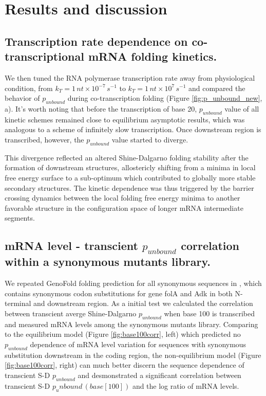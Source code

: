\documentclass[11pt, a4paper]{article}
\begin{document}
\section{Results and discussion}
\subsection{Transcription rate dependence on co-transcriptional mRNA folding kinetics.}
We then tuned the RNA polymerase transcription rate away from physiological condition, from $k_T = 1 \, nt\times 10^{-7} \, s^{-1}$ to $k_T=1 \, nt \times 10^{7} \, s^{-1}$ and compared the behavior of $p_{unbound}$ during co-transcription folding (Figure \ref{fig:p_unbound_new}, a). It's worth noting that before the transcription of base 20, $p_{unbound}$ value of all kinetic schemes remained close to equilibrium asymptotic results, which was analogous to a scheme of infinitely slow transcription. Once downstream region is transcribed, however, the $p_{unbound}$ value started to diverge.

This divergence reflected an altered Shine-Dalgarno folding stability after the formation of downstream structures, allostericly shifting from a minima in local free energy surface to a sub-optimum which contributed to globally more stable secondary structures. The kinetic dependence was thus triggered by the barrier crossing dynamics between the local folding free energy minima to another favorable structure in the configuration space of longer mRNA intermediate segments.

\subsection{mRNA level - transcient $p_{unbound}$ correlation within a synonymous mutants library.}
We repeated GenoFold folding prediction for all synonymous sequences in \cite{}, which contains synonymous codon substitutions for gene folA and Adk in both N-terminal and downstream region. As a initial test we calculated the correlation between transcient averge Shine-Dalgarno $p_{unbound}$ when base 100 is transcribed and measured mRNA levels among the synonymous mutants library. Comparing to the equilibrium model (Figure \ref{fig:base100corr}, left) which predicted no $p_{unbound}$ dependence of mRNA level variation for sequences with synonymous substitution downstream in the coding region, the non-equilibrium model (Figure \ref{fig:base100corr}, right) can much better discern the sequence dependence of transcient S-D $p_{unbound}$ and desmonstrated a significant correlation between transcient S-D $p_unbound \,(base[100])$ and the log ratio of mRNA levels.
\end{document}
